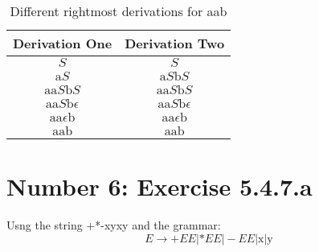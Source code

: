 \documentclass[12pt,a4paper,twoside]{article}  %
\begin{document}
\begin{enumerate}
\begin{table}
\begin{tabular}{c || c }
Derivation One & Derivation Two \\
\hline\hline
$S$                               & $S$ \\
$\textrm{a}S$                     & $\textrm{a}S\textrm{b}S$ \\
$\textrm{aa}S\textrm{b}S$         & $\textrm{aa}S\textrm{b}S$ \\
$\textrm{aa}S\textrm{b}\epsilon$  & $\textrm{aa}S\textrm{b}\epsilon$ \\
$\textrm{aa}\epsilon\textrm{b}$   & $\textrm{aa}\epsilon\textrm{b}$ \\
$\textrm{aab}$                    & $\textrm{aab}$
\end{tabular}
\caption{Different rightmost derivations for aab}\label{5.4.1.c}
\end{table}

\end{enumerate}

\section{Number 6: Exercise 5.4.7.a}

Usng the string +*-xyxy and the grammar:
\begin{equation}
E \rightarrow +EE | *EE | -EE | \textrm{x} | \textrm{y}
\end{equation}
\end{document}
